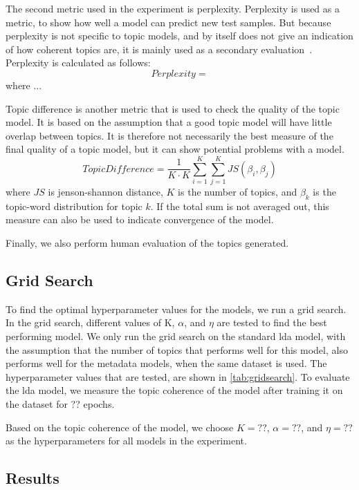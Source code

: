 The second metric used in the experiment is perplexity.
Perplexity is used as a metric, to show how well a model can predict new test samples.
But because perplexity is not specific to topic models, and by itself does not give an indication of how coherent topics are, it is mainly used as a secondary evaluation~\cite{tea_leaves}.
Perplexity is calculated as follows:
\begin{equation}
	Perplexity = 
\end{equation}
\noindent where ...

Topic difference is another metric that is used to check the quality of the topic model.
It is based on the assumption that a good topic model will have little overlap between topics.
It is therefore not necessarily the best measure of the final quality of a topic model, but it can show potential problems with a model.
\begin{equation}
	TopicDifference = \frac{1}{K \cdot K} \sum_{i=1}^{K} \sum_{j=1}^{K} JS(\beta_{i},\beta_{j})
\end{equation}
\noindent where $JS$ is jenson-shannon distance, $K$ is the number of topics, and $\beta_{k}$ is the topic-word distribution for topic $k$.
If the total sum is not averaged out, this measure can also be used to indicate convergence of the model.

Finally, we also perform human evaluation of the topics generated.

\subsection{Grid Search}\label{sec:experiment_gridsearch}
To find the optimal hyperparameter values for the models, we run a grid search.
In the grid search, different values of K, $\alpha$, and $\eta$ are tested to find the best performing model.
We only run the grid search on the standard \gls{lda} model, with the assumption that the number of topics that performs well for this model, also performs well for the metadata models, when the same dataset is used.
The hyperparameter values that are tested, are shown in \autoref{tab:gridsearch}.
To evaluate the \gls{lda} model, we measure the topic coherence of the model after training it on the dataset for ?? epochs.

Based on the topic coherence of the model, we choose $K = ??$, $\alpha = ??$, and $\eta = ??$ as the hyperparameters for all models in the experiment.



\subsection{Results}\label{sec:results}


